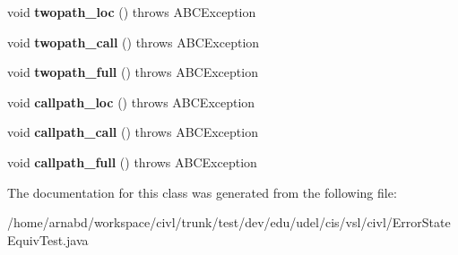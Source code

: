 \begin{DoxyCompactItemize}
\item 
\hypertarget{classedu_1_1udel_1_1cis_1_1vsl_1_1civl_1_1ErrorStateEquivTest_ae0fdd59f1a9c9387aab71732d618cfbb}{}void {\bfseries twopath\+\_\+loc} ()  throws A\+B\+C\+Exception \label{classedu_1_1udel_1_1cis_1_1vsl_1_1civl_1_1ErrorStateEquivTest_ae0fdd59f1a9c9387aab71732d618cfbb}

\item 
\hypertarget{classedu_1_1udel_1_1cis_1_1vsl_1_1civl_1_1ErrorStateEquivTest_a91e22782d6b5d11ccd2ba3f3c65dfedb}{}void {\bfseries twopath\+\_\+call} ()  throws A\+B\+C\+Exception \label{classedu_1_1udel_1_1cis_1_1vsl_1_1civl_1_1ErrorStateEquivTest_a91e22782d6b5d11ccd2ba3f3c65dfedb}

\item 
\hypertarget{classedu_1_1udel_1_1cis_1_1vsl_1_1civl_1_1ErrorStateEquivTest_a2a00c811f7e4c9c83c67be2219cc6d99}{}void {\bfseries twopath\+\_\+full} ()  throws A\+B\+C\+Exception \label{classedu_1_1udel_1_1cis_1_1vsl_1_1civl_1_1ErrorStateEquivTest_a2a00c811f7e4c9c83c67be2219cc6d99}

\item 
\hypertarget{classedu_1_1udel_1_1cis_1_1vsl_1_1civl_1_1ErrorStateEquivTest_a8014c896689bcc4de3b155347c946563}{}void {\bfseries callpath\+\_\+loc} ()  throws A\+B\+C\+Exception \label{classedu_1_1udel_1_1cis_1_1vsl_1_1civl_1_1ErrorStateEquivTest_a8014c896689bcc4de3b155347c946563}

\item 
\hypertarget{classedu_1_1udel_1_1cis_1_1vsl_1_1civl_1_1ErrorStateEquivTest_a7e1dccd8344ca4b98ebad6f6facb4cd9}{}void {\bfseries callpath\+\_\+call} ()  throws A\+B\+C\+Exception \label{classedu_1_1udel_1_1cis_1_1vsl_1_1civl_1_1ErrorStateEquivTest_a7e1dccd8344ca4b98ebad6f6facb4cd9}

\item 
\hypertarget{classedu_1_1udel_1_1cis_1_1vsl_1_1civl_1_1ErrorStateEquivTest_ab9235b5e87a845b0d6d3caa5ea3264f5}{}void {\bfseries callpath\+\_\+full} ()  throws A\+B\+C\+Exception \label{classedu_1_1udel_1_1cis_1_1vsl_1_1civl_1_1ErrorStateEquivTest_ab9235b5e87a845b0d6d3caa5ea3264f5}

\end{DoxyCompactItemize}


The documentation for this class was generated from the following file\+:\begin{DoxyCompactItemize}
\item 
/home/arnabd/workspace/civl/trunk/test/dev/edu/udel/cis/vsl/civl/Error\+State\+Equiv\+Test.\+java\end{DoxyCompactItemize}
